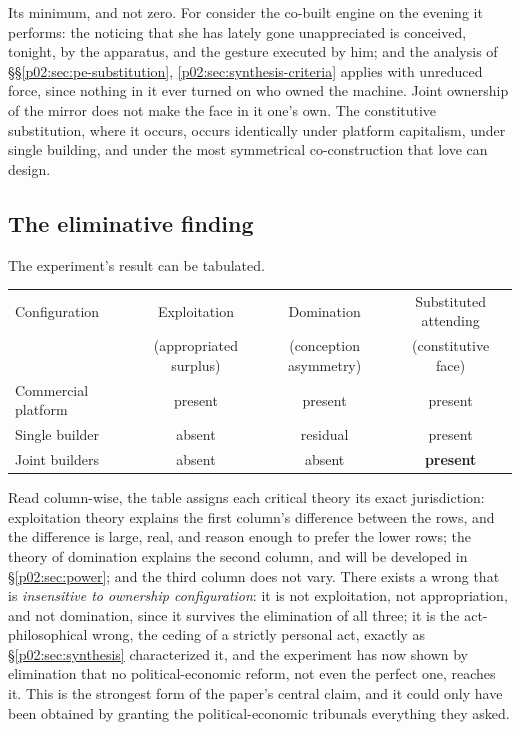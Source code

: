 \documentclass[11pt,a4paper]{article}
\newcommand{\term}[1]{\textit{\textcolor{pinkitalic}{#1}}}
\begin{document}
Its minimum, and not zero. For consider the co-built engine on the evening it performs: the noticing that she has lately gone unappreciated is conceived, tonight, by the apparatus, and the gesture executed by him; and the analysis of \S\S\ref{p02:sec:pe-substitution}, \ref{p02:sec:synthesis-criteria} applies with unreduced force, since nothing in it ever turned on who owned the machine. Joint ownership of the mirror does not make the face in it one's own. The constitutive substitution, where it occurs, occurs identically under platform capitalism, under single building, and under the most symmetrical co-construction that love can design.

\subsection{The eliminative finding}
\label{p02:sec:ex-finding}

The experiment's result can be tabulated.

\begin{center}
\small
\begin{tabular}{lccc}
\hline
Configuration & Exploitation & Domination & Substituted attending \\
 & (appropriated surplus) & (conception asymmetry) & (constitutive face) \\
\hline
Commercial platform & present & present & present \\
Single builder & absent & residual & present \\
Joint builders & absent & absent & \textbf{present} \\
\hline
\end{tabular}
\end{center}

\vspace{0.3em}
\noindent Read column-wise, the table assigns each critical theory its exact jurisdiction: exploitation theory explains the first column's difference between the rows, and the difference is large, real, and reason enough to prefer the lower rows; the theory of domination explains the second column, and will be developed in \S\ref{p02:sec:power}; and the third column does not vary. There exists a wrong that is \term{insensitive to ownership configuration}: it is not exploitation, not appropriation, and not domination, since it survives the elimination of all three; it is the act-philosophical wrong, the ceding of a strictly personal act, exactly as \S\ref{p02:sec:synthesis} characterized it, and the experiment has now shown by elimination that no political-economic reform, not even the perfect one, reaches it. This is the strongest form of the paper's central claim, and it could only have been obtained by granting the political-economic tribunals everything they asked.
\end{document}
